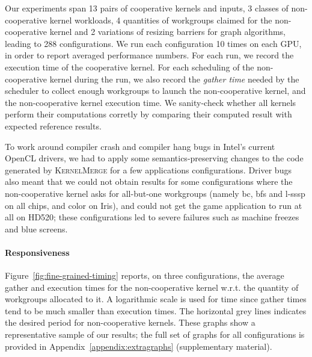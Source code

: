 \documentclass[numbers,nocopyrightspace,10pt]{sigplanconf}
\newcommand{\kernelmerge}{\textsc{KernelMerge}}
\newcommand{\myfiglong}{Figure~}
\begin{document}
Our experiments span 13 pairs of cooperative kernels and inputs, 3
classes of non-cooperative kernel workloads, 4 quantities of workgroups
claimed for the non-cooperative kernel and 2 variations of resizing
barriers for graph algorithms, leading to 288 configurations.  We run
each configuration 10 times on each GPU, in order to report averaged
performance numbers. For each run, we record the execution time of the
cooperative kernel. For each scheduling of the non-cooperative kernel
during the run, we also record the \emph{gather time} needed by the
scheduler to collect enough workgroups to launch the non-cooperative
kernel, and the non-cooperative kernel execution time. We sanity-check
whether all kernels perform their computations corretly by comparing
their computed result with expected reference results.

To work around compiler crash and compiler hang bugs in Intel's current
OpenCL drivers, we had to apply some semantics-preserving changes to the
code generated by \kernelmerge{} for a few applications configurations.
Driver bugs also meant that we could not obtain results for some configurations where the
non-cooperative kernel asks for all-but-one workgroups (namely bc, bfs
and l-sssp on all chips, and color on Iris), and could not get the game
application to run at all on HD520; these configurations led to
severe failures such as machine freezes and blue screens.


\paragraph{Responsiveness}

\myfiglong\ref{fig:fine-grained-timing} reports, on three
configurations, the average gather and execution times for the non-cooperative
kernel w.r.t. the quantity of workgroups allocated to it.
A logarithmic
scale is used for time since gather times tend to be much smaller than
execution times. The horizontal grey lines indicates the desired period
for non-cooperative kernels.  These graphs show a representative sample of our results; the full set of graphs for all configurations is provided in Appendix~\ref{appendix:extragraphs} (supplementary material).
\end{document}

